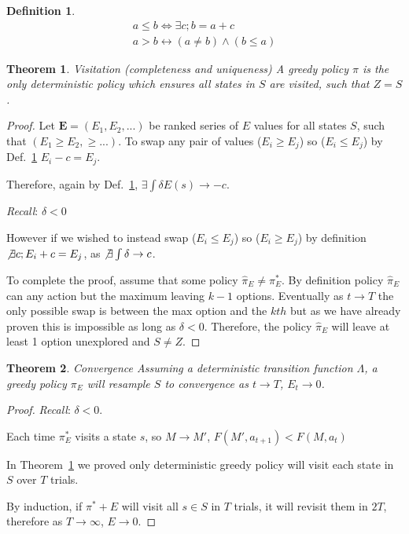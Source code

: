 \documentclass[9pt,twocolumn,twoside]{pnas-new}
\newtheorem{theorem}{Theorem}
\newtheorem{definition}{Definition}
\begin{document}
\begin{definition} \label{def:ineq}
    \begin{align}
        a \leq b \Leftrightarrow \exists c; b = a + c \\
        a > b \leftrightarrow (a \neq b) \wedge (b \leq a) 
    \end{align}
\end{definition}


\begin{theorem}{Visitation (completeness and uniqueness)} \label{theorem:Z}
A greedy policy $\pi$ is the only deterministic policy which ensures all states in $S$ are visited, such that $Z = S$.
\end{theorem}
\begin{proof}    
    Let $\textbf{E} = (E_1, E_2, ...)$ be ranked series of $E$ values for all states $S$, such that $(E_1 \geq E_2, \geq ...)$. To swap any pair of values ($E_i \geq E_j$) so ($E_i \leq E_j$) by Def.~\ref{def:ineq} $E_i - c = E_j$.  

    Therefore, again by Def.~\ref{def:ineq}, $\exists \int \delta E(s) \rightarrow -c$. 

    \textit{Recall}: $\delta < 0$ 

    However if we wished to instead swap ($E_i \leq E_j$) so ($E_i \geq E_j$) by definition $\not \exists c; E_i + c = E_j$, as $\not \exists \int \delta \rightarrow c$. 

    To complete the proof, assume that some policy $\hat \pi_E \neq \pi^*_E$. By definition policy $\hat \pi_E$ can any action but the maximum leaving $k-1$ options. Eventually as $t \rightarrow T$ the only possible swap is between the max option and the $kth$ but as we have already proven this is impossible as long as $\delta < 0$. Therefore, the policy $\hat \pi_E$ will leave at least 1 option unexplored and $S \neq Z$.
\end{proof}

\begin{theorem}{Convergence}
    Assuming a deterministic transition function $\Lambda$, a greedy policy $\pi_E$ will resample $S$ to convergence as $t \rightarrow T$, $E_t \rightarrow 0$.
\end{theorem}
\begin{proof}
    \textit{Recall}: $\delta < 0$. 

    Each time $\pi^*_E$ visits a state $s$, so $M \rightarrow M'$, $F(M', a_{t+1}) < F(M, a_t)$

    In Theorem~\ref{theorem:Z} we proved only deterministic greedy policy will visit each state in $S$ over $T$ trials.
    
    By induction, if $\pi^*+E$ will visit all $s \in S$ in $T$ trials, it will revisit them in $2T$, therefore as $T \rightarrow \infty$, $E \rightarrow 0$. 
\end{proof}
\end{document}
